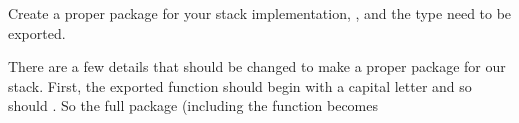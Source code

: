 \begin{Exercise}[title={Stack as package},difficulty=2]
\label{ex:stack-package}
\Question\label{ex:stack-package q1} Create a proper package for your
stack implementation, ,  and the  type need to be
exported.

\end{Exercise}

\begin{Answer}
There are a few details that should be changed to make a proper package
for our stack. First, the exported function should begin with a capital 
letter and so should . So the full package (including the
 function becomes

\end{Answer}
